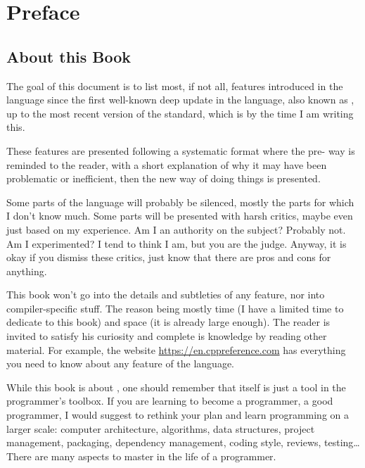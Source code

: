 \chapter{Preface}
\renewcommand*\thesection{\arabic{section}}

\section{About this Book}
The goal of this document is to list most, if not all, features
introduced in the \cpp language since the first well-known deep update
in the language, also known as , up to the most recent version
of the standard, which is  by the time I am writing this.

These features are presented following a systematic format where the
pre- way is reminded to the reader, with a short explanation of
why it may have been problematic or inefficient, then the new way of
doing things is presented.

Some parts of the language will probably be silenced, mostly the parts
for which I don't know much. Some parts will be presented with harsh
critics, maybe even just based on my experience. Am I an authority on
the subject? Probably not. Am I experimented? I tend to think I am,
but you are the judge. Anyway, it is okay if you dismiss these
critics, just know that there are pros and cons for anything.

This book won't go into the details and subtleties of any feature, nor
into compiler-specific stuff. The reason being mostly time (I have a
limited time to dedicate to this book) and space (it is already large
enough). The reader is invited to satisfy his curiosity and complete
is knowledge by reading other material. For example, the website
\url{https://en.cppreference.com} has everything you need to know
about any feature of the language.

\bigskip

While this book is about \cpp, one should remember that \cpp{} itself
is just a tool in the programmer's toolbox. If you are learning \cpp{}
to become a programmer, a good programmer, I would suggest to rethink
your plan and learn programming on a larger scale: computer
architecture, algorithms, data structures, project management,
packaging, dependency management, coding style, reviews, testing…
There are many aspects to master in the life of a programmer.

